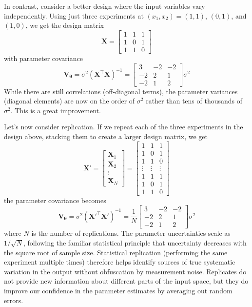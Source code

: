 In contrast, consider a better design where the input variables vary independently. Using just three experiments at $(x_1, x_2) = (1, 1)$, $(0, 1)$, and $(1, 0)$, we get the design matrix
\begin{equation}
    \mathbf{X} = \begin{bmatrix} 1 & 1 & 1 \\ 1 & 0 & 1 \\ 1 & 1 & 0 \end{bmatrix}
\end{equation}
with parameter covariance
\begin{equation}
    \mathbf{V}_{\boldsymbol{\theta}} = \sigma^2 \left(\mathbf{X}^\top \mathbf{X}\right)^{-1} = \begin{bmatrix} 3 & -2 & -2 \\ -2 & 2 & 1 \\ -2 & 1 & 2 \end{bmatrix} \sigma^2
\end{equation}
While there are still correlations (off-diagonal terms), the parameter variances (diagonal elements) are now on the order of $\sigma^2$ rather than tens of thousands of $\sigma^2$. This is a great improvement.

Let's now consider replication. If we repeat each of the three experiments in the design above, stacking them to create a larger design matrix, we get
\begin{equation}
    \mathbf{X}' = \begin{bmatrix} \mathbf{X}_1 \\ \mathbf{X}_2 \\ \vdots \\ \mathbf{X}_N \end{bmatrix} = \begin{bmatrix} 1 & 1 & 1 \\ 1 & 0 & 1 \\ 1 & 1 & 0 \\ \vdots & \vdots & \vdots \\ 1 & 1 & 1 \\ 1 & 0 & 1 \\ 1 & 1 & 0 \end{bmatrix}
\end{equation}
the parameter covariance becomes
\begin{equation}
    \mathbf{V}_{\boldsymbol{\theta}} = \sigma^2 \left(\mathbf{X}'^\top \mathbf{X}'\right)^{-1} = \frac{1}{N} \begin{bmatrix} 3 & -2 & -2 \\ -2 & 2 & 1 \\ -2 & 1 & 2 \end{bmatrix} \sigma^2
\end{equation}
where $N$ is the number of replications. The parameter uncertainties scale as $1/\sqrt{N}$, following the familiar statistical principle that uncertainty decreases with the square root of sample size. Statistical replication (performing the same experiment multiple times) therefore helps identify sources of true systematic variation in the output without obfuscation by measurement noise. Replicates do not provide new information about different parts of the input space, but they do improve our confidence in the parameter estimates by averaging out random errors.

